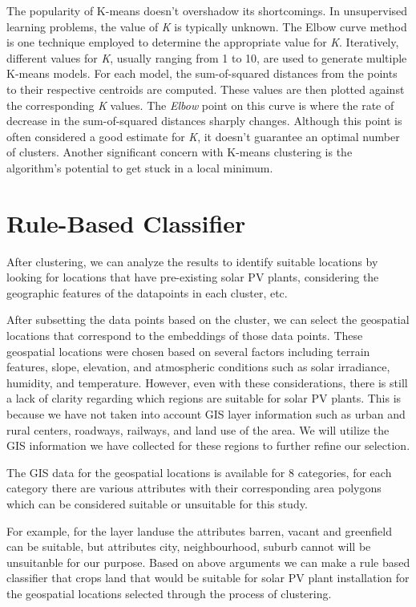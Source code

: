 \documentclass[a4paper,12pt]{Classes/RoboticsLaTeX}
\begin{document}
	 The popularity of K-means doesn't overshadow its shortcomings. In unsupervised learning problems, the value of \textit{K} 
	 is typically unknown. The Elbow curve method is one technique employed to determine the appropriate value for \textit{K}. 
	 Iteratively, different values for \textit{K}, usually ranging from 1 to 10, are used to generate multiple K-means models. 
	 For each model, the sum-of-squared distances from the points to their respective centroids are computed. These values are 
	 then plotted against the corresponding \textit{K} values. The \textit{Elbow} point on this curve is where the rate of decrease 
	 in the sum-of-squared distances sharply changes. Although this point is often considered a good estimate for \textit{K}, it doesn't 
	 guarantee an optimal number of clusters. Another significant concern with K-means clustering is the algorithm's potential to get stuck in a local minimum.


	\section{Rule-Based Classifier}

	After clustering, we can analyze the results to identify suitable locations by looking for locations that have pre-existing solar PV plants, considering the 
	geographic features of the datapoints in each cluster, etc. 

	After subsetting the data points based on the cluster, we can select the geospatial locations that correspond to the embeddings of those data points. These 
	geospatial locations were chosen based on several factors including terrain features, slope, elevation, and atmospheric conditions such as solar irradiance, 
	humidity, and temperature. However, even with these considerations, there is still a lack of clarity regarding which regions are suitable for solar PV plants. 
	This is because we have not taken into account \ac{GIS} layer information such as urban and rural centers, roadways, railways, and land use of the area. We will utilize 
	the \ac{GIS} information we have collected for these regions to further refine our selection.

	The \ac{GIS} data for the geospatial locations is available for 8 categories, for each category there are various
	attributes with their corresponding area polygons which can be considered suitable or unsuitable for this study.

	For example, for the layer landuse the attributes barren, vacant and greenfield can be suitable, but attributes city,
	neighbourhood, suburb cannot will be unsuitanble for our purpose. Based on above arguments we can make a rule 
	based classifier that crops land that would be suitable for solar PV plant installation for the geospatial locations
	selected through the process of clustering. 
	
\end{document}

